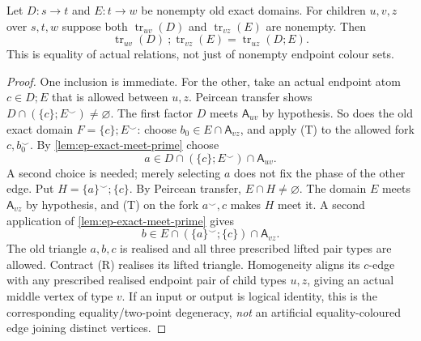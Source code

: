 \begin{theorem}
\label{thm:ep-trace-product}
Let \(D:s\to t\) and \(E:t\to w\) be nonempty old exact domains.
For children \(u,v,z\) over \(s,t,w\) suppose both
\(\operatorname{tr}_{uv}(D)\) and
\(\operatorname{tr}_{vz}(E)\) are nonempty. Then
\[
 \boxed{\ 
 \operatorname{tr}_{uv}(D)\ ;
 \operatorname{tr}_{vz}(E)
   =\operatorname{tr}_{uz}(D;E).\
 }\tag{TP}\label{eq:ep-tp}
\]
This is equality of actual relations, not just of nonempty
endpoint colour sets.
\end{theorem}
\begin{proof}
One inclusion is immediate. For the other, take an actual
endpoint atom \(c\in D;E\) that is allowed between \(u,z\).
Peircean transfer shows
\(D\cap(\{c\};E^\smile)\ne\varnothing\).
The first factor \(D\) meets \(\mathsf A_{uv}\) by hypothesis.
So does the old exact domain
\(F=\{c\};E^\smile\): choose
\(b_0\in E\cap\mathsf A_{vz}\), and apply (T) to the allowed
fork \(c,b_0^\smile\). By
\cref{lem:ep-exact-meet-prime} choose
\[
 a\in D\cap(\{c\};E^\smile)\cap\mathsf A_{uv}.
\]
A second choice is needed; merely selecting \(a\) does not fix
the phase of the other edge.  Put
\(H=\{a\}^\smile;\{c\}\). By Peircean transfer,
\(E\cap H\ne\varnothing\). The domain \(E\) meets
\(\mathsf A_{vz}\) by hypothesis, and (T) on the fork
\(a^\smile,c\) makes \(H\) meet it.
A second application of
\cref{lem:ep-exact-meet-prime} gives
\[
 b\in E\cap(\{a\}^\smile;\{c\})\cap\mathsf A_{vz}.
\]
The old triangle \(a,b,c\) is realised and all three prescribed
lifted pair types are allowed. Contract (R) realises its lifted
triangle. Homogeneity aligns its \(c\)-edge with any prescribed
realised endpoint pair of child types \(u,z\), giving an actual
middle vertex of type \(v\). If an input or output is logical
identity, this is the corresponding equality/two-point
degeneracy, \emph{not} an artificial equality-coloured edge
joining distinct vertices.
\end{proof}

